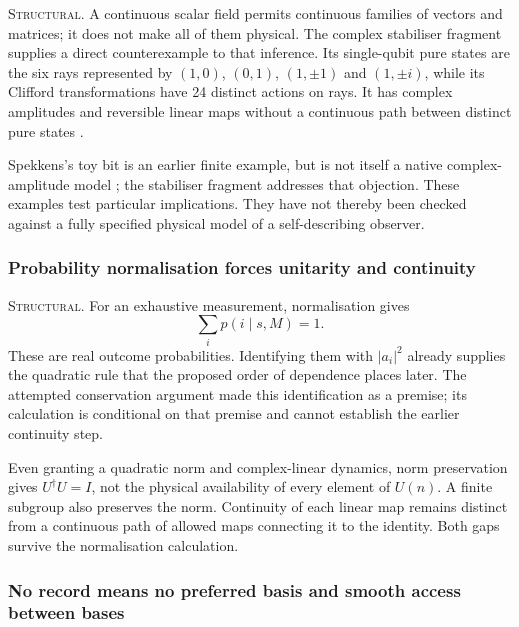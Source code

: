 \noindent\textsc{Structural.}
A continuous scalar field permits continuous families of vectors and
matrices; it does not make all of them physical. The complex stabiliser
fragment supplies a direct counterexample to that inference. Its
single-qubit pure states are the six rays represented by
$(1,0)$, $(0,1)$, $(1,\pm1)$ and $(1,\pm i)$, while its Clifford
transformations have 24 distinct actions on rays. It has complex amplitudes
and reversible linear maps without a continuous path between distinct pure
states \autocite{backens2014zx}.

Spekkens's toy bit is an earlier finite example, but is not itself a native
complex-amplitude model \autocite{spekkens2007toy}; the stabiliser fragment
addresses that objection. These examples test particular implications.
They have not thereby been checked against a fully specified physical model
of a self-describing observer.

\subsubsection{Probability normalisation forces unitarity and continuity}
\label{app:continuity-normalisation}

\noindent\textsc{Structural.}
For an exhaustive measurement, normalisation gives
\begin{equation}
  \sum_i p(i\mid s,M)=1.
  \label{eq:continuity-operational-normalisation}
\end{equation}
These are real outcome probabilities. Identifying them with $|a_i|^2$
already supplies the quadratic rule that the proposed order of dependence
places later. The attempted conservation argument made this identification
as a premise; its calculation is conditional on that premise and cannot
establish the earlier continuity step.

Even granting a quadratic norm and complex-linear dynamics, norm
preservation gives $U^\dagger U=I$, not the physical availability of every
element of $U(n)$. A finite subgroup also preserves the norm. Continuity of
each linear map remains distinct from a continuous path of allowed maps
connecting it to the identity. Both gaps survive the normalisation calculation.

\subsubsection{No record means no preferred basis and smooth access between bases}
\label{app:continuity-bases}

